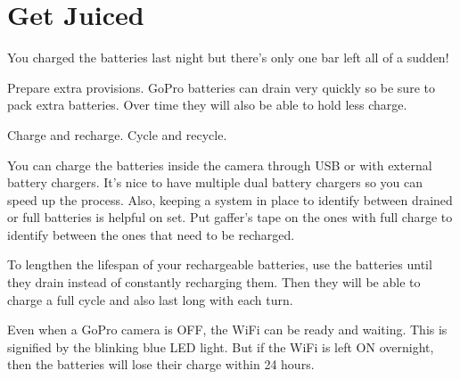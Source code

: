 \chapter{Get Juiced}
\pagecolor{white}
\label{chap:7}
\begin{fullwidth}


\problem

{\large You charged the batteries last night but there’s only one bar left all of a sudden! \par}

Prepare extra provisions. GoPro batteries can drain very quickly so be sure to pack extra batteries. Over time they will also be able to hold less charge. 


\solution

{\large Charge and recharge. Cycle and recycle. \par}

You can charge the batteries inside the camera through USB or with external battery chargers. It’s nice to have multiple dual battery chargers so you can speed up the process. Also, keeping a system in place to identify between drained or full batteries is helpful on set. Put gaffer’s tape on the ones with full charge to identify between the ones that need to be recharged. 

To lengthen the lifespan of your rechargeable batteries, use the batteries until they drain instead of constantly recharging them. Then they will be able to charge a full cycle and also last long with each turn. 

\tip Even when a GoPro camera is OFF, the WiFi can be ready and waiting. This is signified by the blinking blue LED light. But if the WiFi is left ON overnight, then the batteries will lose their charge within 24 hours.




\clearpage
\end{fullwidth}
